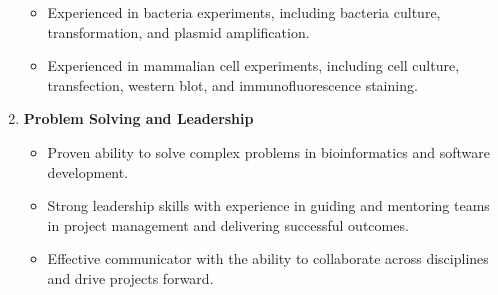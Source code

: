 \begin{enumerate}
\begin{itemize}
        \item Experienced in bacteria experiments, including bacteria culture, transformation, and plasmid amplification.
        \item Experienced in mammalian cell experiments, including cell culture, transfection, western blot, and immunofluorescence staining.
    \end{itemize}
    \item \textbf{Problem Solving and Leadership}
    \begin{itemize}
        \item Proven ability to solve complex problems in bioinformatics and software development.
        \item Strong leadership skills with experience in guiding and mentoring teams in project management and delivering successful outcomes.
        \item Effective communicator with the ability to collaborate across disciplines and drive projects forward.
    \end{itemize}
\end{enumerate}


